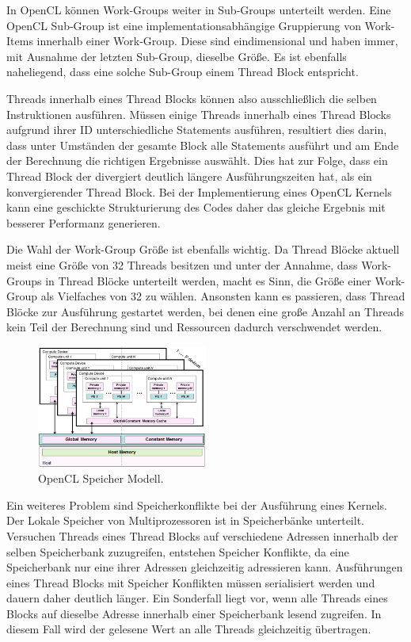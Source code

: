 In OpenCL können Work-Groups weiter in Sub-Groups unterteilt werden.
Eine OpenCL Sub-Group ist eine implementationsabhängige Gruppierung von Work-Items innerhalb einer Work-Group.
Diese sind eindimensional und haben immer, mit Ausnahme der letzten Sub-Group, dieselbe Größe.
Es ist ebenfalls naheliegend, dass eine solche Sub-Group einem Thread Block entspricht.

Threads innerhalb eines Thread Blocks können also ausschließlich die selben Instruktionen ausführen.
Müssen einige Threads innerhalb eines Thread Blocks aufgrund ihrer ID unterschiedliche Statements ausführen, resultiert dies darin, dass unter Umständen der gesamte Block alle Statements ausführt und am Ende der Berechnung die richtigen Ergebnisse auswählt.
Dies hat zur Folge, dass ein Thread Block der divergiert deutlich längere Ausführungszeiten hat, als ein konvergierender Thread Block.
Bei der Implementierung eines OpenCL Kernels kann eine geschickte Strukturierung des Codes daher das gleiche Ergebnis mit besserer Performanz generieren.

Die Wahl der Work-Group Größe ist ebenfalls wichtig.
Da Thread Blöcke aktuell meist eine Größe von 32 Threads besitzen und unter der Annahme, dass Work-Groups in Thread Blöcke unterteilt werden, macht es Sinn, die Größe einer Work-Group als Vielfaches von 32 zu wählen.
Ansonsten kann es passieren, dass Thread Blöcke zur Ausführung gestartet werden, bei denen eine große Anzahl an Threads kein Teil der Berechnung sind und Ressourcen dadurch verschwendet werden.

\begin{figure}
	\centering
	\includegraphics[width=0.5\textwidth]{../../Grafiken/OpenCL-Memory-Model.PNG}
	\caption{OpenCL Speicher Modell. \cite{OCLSPC}}
	\label{fig::ga06}
\end{figure} 
Ein weiteres Problem sind Speicherkonflikte bei der Ausführung eines Kernels.
Der Lokale Speicher von Multiprozessoren ist in Speicherbänke unterteilt.
Versuchen Threads eines Thread Blocks auf verschiedene Adressen innerhalb der selben Speicherbank zuzugreifen, entstehen Speicher Konflikte, da eine Speicherbank nur eine ihrer Adressen gleichzeitig adressieren kann.
Ausführungen eines Thread Blocks mit Speicher Konflikten müssen serialisiert werden und dauern daher deutlich länger.
Ein Sonderfall liegt vor, wenn alle Threads eines Blocks auf dieselbe Adresse innerhalb einer Speicherbank lesend zugreifen.
In diesem Fall wird der gelesene Wert an alle Threads gleichzeitig übertragen.